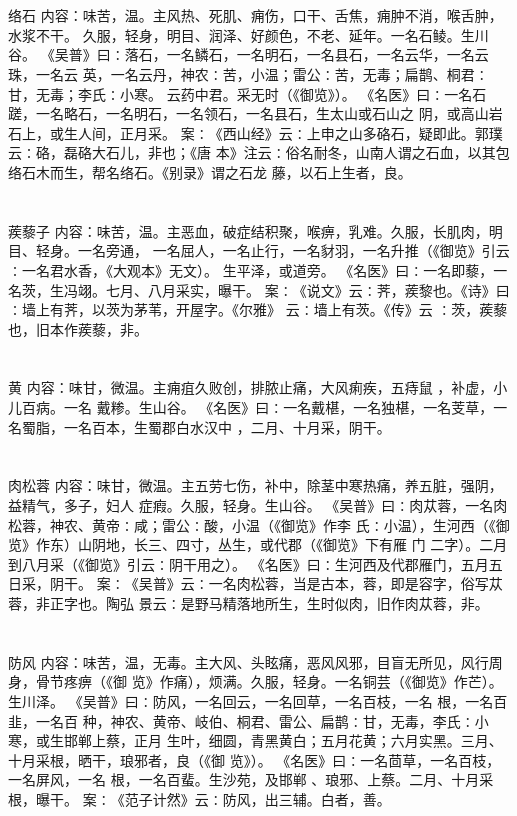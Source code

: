 \documentclass[12pt,UTF8]{ctexbook}
\begin{document}
\chapter{}络石
内容：味苦，温。主风热、死肌、痈伤，口干、舌焦，痈肿不消，喉舌肿，水浆不干。 
久服，轻身，明目、润泽、好颜色，不老、延年。一名石鲮。生川谷。 
《吴普》曰∶落石，一名鳞石，一名明石，一名县石，一名云华，一名云珠，一名云 
英，一名云丹，神农∶苦，小温；雷公∶苦，无毒；扁鹊、桐君∶甘，无毒；李氏∶小寒。 
云药中君。采无时（《御览》）。 
《名医》曰∶一名石蹉，一名略石，一名明石，一名领石，一名县石，生太山或石山之 
阴，或高山岩石上，或生人间，正月采。 
案∶《西山经》云∶上申之山多硌石，疑即此。郭璞云∶硌，磊硌大石儿，非也；《唐 
本》注云∶俗名耐冬，山南人谓之石血，以其包络石木而生，帮名络石。《别录》谓之石龙 
藤，以石上生者，良。 


\chapter{}蒺藜子
内容：味苦，温。主恶血，破症结积聚，喉痹，乳难。久服，长肌肉，明目、轻身。一名旁通， 
一名屈人，一名止行，一名豺羽，一名升推（《御览》引云∶一名君水香，《大观本》无文）。 
生平泽，或道旁。 
《名医》曰∶一名即藜，一名茨，生冯翊。七月、八月采实，曝干。 
案∶《说文》云∶荠，蒺黎也。《诗》曰∶墙上有荠，以茨为茅苇，开屋字。《尔雅》 
云∶墙上有茨。《传》云 
∶茨，蒺藜也，旧本作蒺藜，非。 


\chapter{}黄
内容：味甘，微温。主痈疽久败创，排脓止痛，大风痢疾，五痔鼠 ，补虚，小儿百病。一名 
戴糁。生山谷。 
《名医》曰∶一名戴椹，一名独椹，一名芰草，一名蜀脂，一名百本，生蜀郡白水汉中 
，二月、十月采，阴干。 


\chapter{}肉松蓉
内容：味甘，微温。主五劳七伤，补中，除茎中寒热痛，养五脏，强阴，益精气，多子，妇人 
症瘕。久服，轻身。生山谷。 
《吴普》曰∶肉苁蓉，一名肉松蓉，神农、黄帝∶咸；雷公∶酸，小温（《御览》作李 
氏∶小温），生河西（《御览》作东）山阴地，长三、四寸，丛生，或代郡（《御览》下有雁 
门 
二字）。二月到八月采（《御览》引云∶阴干用之）。 
《名医》曰∶生河西及代郡雁门，五月五日采，阴干。 
案∶《吴普》云∶一名肉松蓉，当是古本，蓉，即是容字，俗写苁蓉，非正字也。陶弘 
景云∶是野马精落地所生，生时似肉，旧作肉苁蓉，非。 


\chapter{}防风
内容：味苦，温，无毒。主大风、头眩痛，恶风风邪，目盲无所见，风行周身，骨节疼痹（《御 
览》作痛），烦满。久服，轻身。一名铜芸（《御览》作芒）。生川泽。 
《吴普》曰∶防风，一名回云，一名回草，一名百枝，一名 根，一名百韭，一名百 
种，神农、黄帝、岐伯、桐君、雷公、扁鹊∶甘，无毒，李氏∶小寒，或生邯郸上蔡，正月 
生叶，细圆，青黑黄白；五月花黄；六月实黑。三月、十月采根，晒干，琅邪者，良（《御 
览》）。 
《名医》曰∶一名茴草，一名百枝，一名屏风，一名 根，一名百蜚。生沙苑，及邯郸 
、琅邪、上蔡。二月、十月采根，曝干。 
案∶《范子计然》云∶防风，出三辅。白者，善。 
\end{document}
